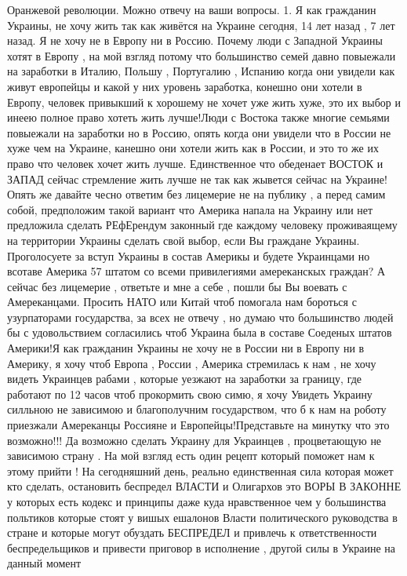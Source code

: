 \begin{itemize}
Оранжевой революции. Можно отвечу на ваши вопросы.
1. Я как гражданин Украины, не хочу жить так как живётся на Украине сегодня, 14
лет назад , 7 лет назад. Я не хочу не в Европу ни в Россию. Почему люди с
Западной Украины хотят в Европу , на мой взгляд потому что большинство семей
давно повыежали на заработки в Италию, Польшу , Португалию , Испанию когда они
увидели как живут европейцы и какой у них уровень заработка, конешно они хотели
в Европу, человек привыкший к хорошему не хочет уже жить хуже, это их выбор и
инеею полное право хотеть жить лучше!Люди с Востока также многие семьями
повыежали на заработки но в Россию, опять когда они увидели что в России не
хуже чем на Украине, канешно они хотели жить как в России, и это то же их право
что человек хочет жить лучше.
Единственное что обеденает ВОСТОК и ЗАПАД сейчас стремление жить лучше не так
как жывется сейчас на Украине! Опять же давайте чесно ответим без лицемерие не
на публику , а перед самим собой, предположим такой вариант что Америка напала
на Украину или нет предложила сделать РЕфЕрендум законный где каждому человеку
проживаящему на территории Украины сделать свой выбор, если Вы граждане
Украины. Проголосуете за вступ Украины в состав Америкы и будете Украинцами но
всотаве Америка 57 штатом со всеми привилегиями амереканскых граждан? А сейчас
без лицемерие , ответьте и мне а себе , пошли бы Вы воевать с Амереканцами.
Просить НАТО или Китай чтоб помогала нам бороться с узурпаторами государства,
за всех не отвечу , но думаю что большинство людей бы с удовольствием
согласились чтоб Украина была в составе Соеденых штатов Америки!Я как гражданин
Украины не хочу не в России ни в Европу ни в Америку, я хочу чтоб Европа ,
России , Америка стремилась к нам , не хочу видеть Украинцев рабами , которые
уезжают на заработки за границу, где работают по 12 часов чтоб прокормить свою
симю, я хочу Увидеть Украину силльною не зависимою и благополучним
государством, что б к нам на роботу приезжали Амереканцы Россияне и
Европейцы!Представьте на минутку что это возможно!!! Да возможно сделать
Украину для Украинцев , процветающую не зависимою страну . 
На мой взгляд есть один рецепт который поможет нам к этому прийти ! На
сегодняшний день, реально единственная сила которая может кто сделать,
остановить беспредел ВЛАСТИ и Олигархов это ВОРЫ В ЗАКОННЕ у которых есть
кодекс и принципы даже куда нравственное чем у большинства польтиков которые
стоят у вишых ешалонов Власти политического руководства в стране и которые
могут обуздать БЕСПРЕДЕЛ и привлечь к ответственности беспредельщиков и
привести приговор в исполнение , другой силы в Украине на данный момент

\end{itemize}
